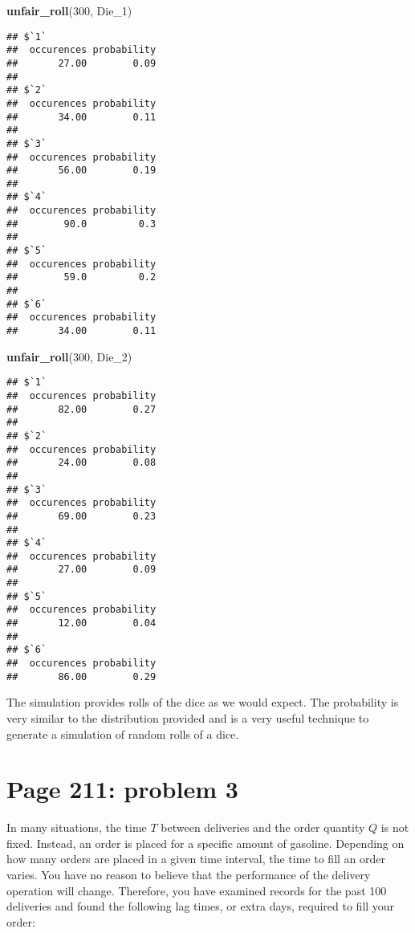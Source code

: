 \documentclass[]{article}
\newenvironment{Shaded}{\begin{snugshade}}{\end{snugshade}}
\newcommand{\KeywordTok}[1]{\textcolor[rgb]{0.13,0.29,0.53}{\textbf{{#1}}}}
\newcommand{\DecValTok}[1]{\textcolor[rgb]{0.00,0.00,0.81}{{#1}}}
\newcommand{\NormalTok}[1]{{#1}}
\begin{document}
\begin{Shaded}
\begin{Highlighting}[]
\KeywordTok{unfair_roll}\NormalTok{(}\DecValTok{300}\NormalTok{, Die_1)}
\end{Highlighting}
\end{Shaded}

\begin{verbatim}
## $`1`
##  occurences probability 
##       27.00        0.09 
## 
## $`2`
##  occurences probability 
##       34.00        0.11 
## 
## $`3`
##  occurences probability 
##       56.00        0.19 
## 
## $`4`
##  occurences probability 
##        90.0         0.3 
## 
## $`5`
##  occurences probability 
##        59.0         0.2 
## 
## $`6`
##  occurences probability 
##       34.00        0.11
\end{verbatim}

\begin{Shaded}
\begin{Highlighting}[]
\KeywordTok{unfair_roll}\NormalTok{(}\DecValTok{300}\NormalTok{, Die_2)}
\end{Highlighting}
\end{Shaded}

\begin{verbatim}
## $`1`
##  occurences probability 
##       82.00        0.27 
## 
## $`2`
##  occurences probability 
##       24.00        0.08 
## 
## $`3`
##  occurences probability 
##       69.00        0.23 
## 
## $`4`
##  occurences probability 
##       27.00        0.09 
## 
## $`5`
##  occurences probability 
##       12.00        0.04 
## 
## $`6`
##  occurences probability 
##       86.00        0.29
\end{verbatim}

The simulation provides rolls of the dice as we would expect. The
probability is very similar to the distribution provided and is a very
useful technique to generate a simulation of random rolls of a dice.

\section{Page 211: problem 3}\label{page-211-problem-3}

In many situations, the time \(T\) between deliveries and the order
quantity \(Q\) is not fixed. Instead, an order is placed for a specific
amount of gasoline. Depending on how many orders are placed in a given
time interval, the time to fill an order varies. You have no reason to
believe that the performance of the delivery operation will change.
Therefore, you have examined records for the past 100 deliveries and
found the following lag times, or extra days, required to fill your
order:
\end{document}
